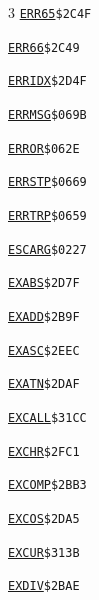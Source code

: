 \begin{multicols}{3}
\noindent\hyperlink{l:ERR65}{\texttt{ERR65}}\hfill\texttt{\$2C4F~\phantom{000}\llap{\pageref{l:ERR65}}}\par
\noindent\hyperlink{l:ERR66}{\texttt{ERR66}}\hfill\texttt{\$2C49~\phantom{000}\llap{\pageref{l:ERR66}}}\par
\noindent\hyperlink{l:ERRIDX}{\texttt{ERRIDX}}\hfill\texttt{\$2D4F~\phantom{000}\llap{\pageref{l:ERRIDX}}}\par
\noindent\hyperlink{l:ERRMSG}{\texttt{ERRMSG}}\hfill\texttt{\$069B~\phantom{000}\llap{\pageref{l:ERRMSG}}}\par
\noindent\hyperlink{l:ERROR}{\texttt{ERROR}}\hfill\texttt{\$062E~\phantom{000}\llap{\pageref{l:ERROR}}}\par
\noindent\hyperlink{l:ERRSTP}{\texttt{ERRSTP}}\hfill\texttt{\$0669~\phantom{000}\llap{\pageref{l:ERRSTP}}}\par
\noindent\hyperlink{l:ERRTRP}{\texttt{ERRTRP}}\hfill\texttt{\$0659~\phantom{000}\llap{\pageref{l:ERRTRP}}}\par
\noindent\hyperlink{l:ESCARG}{\texttt{ESCARG}}\hfill\texttt{\$0227~\phantom{000}\llap{\pageref{l:ESCARG}}}\par
\noindent\hyperlink{l:EXABS}{\texttt{EXABS}}\hfill\texttt{\$2D7F~\phantom{000}\llap{\pageref{l:EXABS}}}\par
\noindent\hyperlink{l:EXADD}{\texttt{EXADD}}\hfill\texttt{\$2B9F~\phantom{000}\llap{\pageref{l:EXADD}}}\par
\noindent\hyperlink{l:EXASC}{\texttt{EXASC}}\hfill\texttt{\$2EEC~\phantom{000}\llap{\pageref{l:EXASC}}}\par
\noindent\hyperlink{l:EXATN}{\texttt{EXATN}}\hfill\texttt{\$2DAF~\phantom{000}\llap{\pageref{l:EXATN}}}\par
\noindent\hyperlink{l:EXCALL}{\texttt{EXCALL}}\hfill\texttt{\$31CC~\phantom{000}\llap{\pageref{l:EXCALL}}}\par
\noindent\hyperlink{l:EXCHR}{\texttt{EXCHR}}\hfill\texttt{\$2FC1~\phantom{000}\llap{\pageref{l:EXCHR}}}\par
\noindent\hyperlink{l:EXCOMP}{\texttt{EXCOMP}}\hfill\texttt{\$2BB3~\phantom{000}\llap{\pageref{l:EXCOMP}}}\par
\noindent\hyperlink{l:EXCOS}{\texttt{EXCOS}}\hfill\texttt{\$2DA5~\phantom{000}\llap{\pageref{l:EXCOS}}}\par
\noindent\hyperlink{l:EXCUR}{\texttt{EXCUR}}\hfill\texttt{\$313B~\phantom{000}\llap{\pageref{l:EXCUR}}}\par
\noindent\hyperlink{l:EXDIV}{\texttt{EXDIV}}\hfill\texttt{\$2BAE~\phantom{000}\llap{\pageref{l:EXDIV}}}\par

\end{multicols}
